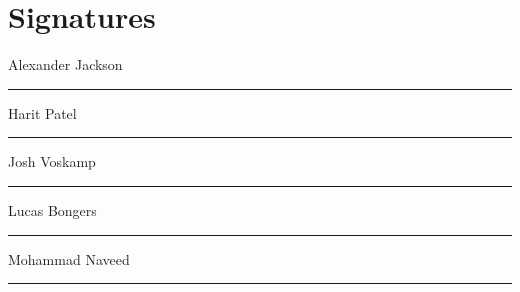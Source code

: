 \documentclass[]{article}
\begin{document}
\section*{Signatures}
\vspace{1cm}
\noindent Alexander Jackson \\\hrule
\vspace{1cm}
\noindent Harit Patel \\\hrule
\vspace{1cm}
\noindent Josh Voskamp \\\hrule
\vspace{1cm}
\noindent Lucas Bongers \\\hrule
\vspace{1cm}
\noindent Mohammad Naveed \\\hrule
%
\end{document}
